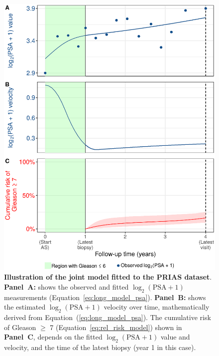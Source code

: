 \begin{figure}
\centerline{\includegraphics[width=\columnwidth]{images/jmExplanationPlot_113.eps}}
\caption{\textbf{Illustration of the joint model fitted to the PRIAS dataset}. \textbf{Panel~A:} shows the observed and fitted $\log_2(\mbox{PSA} + 1)$ measurements (Equation~\ref{eq:long_model_psa}). \textbf{Panel~B:} shows the estimated $\log_2(\mbox{PSA} + 1)$ velocity over time, mathematically derived from Equation~(\ref{eq:long_model_psa}). The cumulative risk of Gleason $\geq$ 7 (Equation~\ref{eq:rel_risk_model}) shown in \textbf{Panel~C}, depends on the fitted $\log_2(\mbox{PSA} + 1)$ value and velocity, and the time of the latest biopsy (year 1 in this case).}
\label{fig:jmExplanationPlot_113}
\end{figure}

